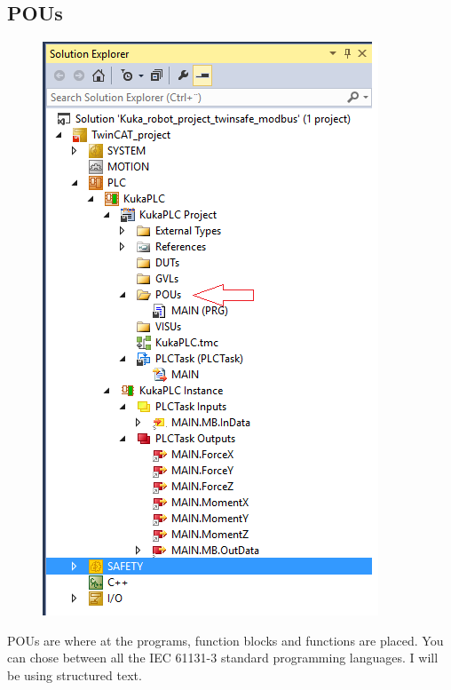 \documentclass{article}
\begin{document}
\subsection{POUs}
\begin{figure}[!h]
    \centering
    \includegraphics[scale=0.7]{pictures/TC3_POUs.png}
    \caption{}
    \label{fig:my_label}
\end{figure}

POUs are where at the programs, function blocks and functions are placed. You can chose between all the IEC 61131-3 standard programming languages. I will be using structured text. 

\newpage
\end{document}
